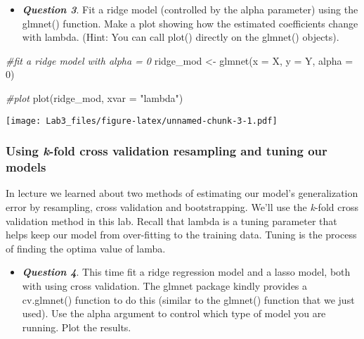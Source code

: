 \documentclass[
]{article}
\newenvironment{Shaded}{\begin{snugshade}}{\end{snugshade}}
\newcommand{\AttributeTok}[1]{\textcolor[rgb]{0.77,0.63,0.00}{#1}}
\newcommand{\CommentTok}[1]{\textcolor[rgb]{0.56,0.35,0.01}{\textit{#1}}}
\newcommand{\DecValTok}[1]{\textcolor[rgb]{0.00,0.00,0.81}{#1}}
\newcommand{\FunctionTok}[1]{\textcolor[rgb]{0.00,0.00,0.00}{#1}}
\newcommand{\NormalTok}[1]{#1}
\newcommand{\OtherTok}[1]{\textcolor[rgb]{0.56,0.35,0.01}{#1}}
\newcommand{\StringTok}[1]{\textcolor[rgb]{0.31,0.60,0.02}{#1}}
\providecommand{\tightlist}{%
  \setlength{\itemsep}{0pt}\setlength{\parskip}{0pt}}
\begin{document}
\begin{itemize}
\tightlist
\item
  \textbf{\emph{Question 3}}. Fit a ridge model (controlled by the alpha
  parameter) using the glmnet() function. Make a plot showing how the
  estimated coefficients change with lambda. (Hint: You can call plot()
  directly on the glmnet() objects).
\end{itemize}

\begin{Shaded}
\begin{Highlighting}[]
\CommentTok{\#fit a ridge model with alpha = 0}
\NormalTok{ridge\_mod }\OtherTok{\textless{}{-}} \FunctionTok{glmnet}\NormalTok{(}\AttributeTok{x =}\NormalTok{ X,}
                    \AttributeTok{y =}\NormalTok{ Y,}
                    \AttributeTok{alpha =} \DecValTok{0}\NormalTok{)}

\CommentTok{\#plot}
\FunctionTok{plot}\NormalTok{(ridge\_mod, }\AttributeTok{xvar =} \StringTok{"lambda"}\NormalTok{)}
\end{Highlighting}
\end{Shaded}

\texttt{[image: Lab3\_files/figure-latex/unnamed-chunk-3-1.pdf]}

\hypertarget{using-k-fold-cross-validation-resampling-and-tuning-our-models}{%
\subsubsection{\texorpdfstring{Using \emph{k}-fold cross validation
resampling and tuning our
models}{Using k-fold cross validation resampling and tuning our models}}\label{using-k-fold-cross-validation-resampling-and-tuning-our-models}}

In lecture we learned about two methods of estimating our model's
generalization error by resampling, cross validation and bootstrapping.
We'll use the \emph{k}-fold cross validation method in this lab. Recall
that lambda is a tuning parameter that helps keep our model from
over-fitting to the training data. Tuning is the process of finding the
optima value of lamba.

\begin{itemize}
\tightlist
\item
  \textbf{\emph{Question 4}}. This time fit a ridge regression model and
  a lasso model, both with using cross validation. The glmnet package
  kindly provides a cv.glmnet() function to do this (similar to the
  glmnet() function that we just used). Use the alpha argument to
  control which type of model you are running. Plot the results.
\end{itemize}
\end{document}
